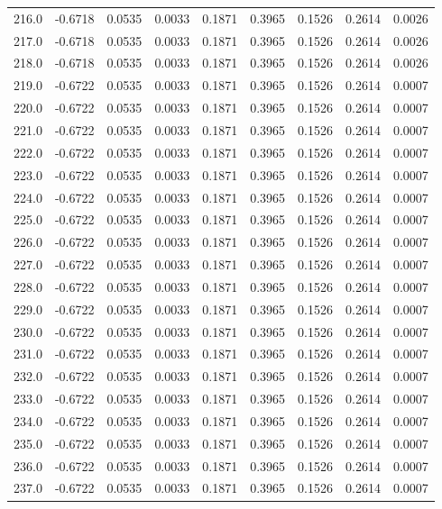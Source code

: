 \begin{longtable}{lrrrrrrrr}
216.0 & -0.6718 & 0.0535 & 0.0033 & 0.1871 & 0.3965 & 0.1526 & 0.2614 & 0.0026 \\
217.0 & -0.6718 & 0.0535 & 0.0033 & 0.1871 & 0.3965 & 0.1526 & 0.2614 & 0.0026 \\
218.0 & -0.6718 & 0.0535 & 0.0033 & 0.1871 & 0.3965 & 0.1526 & 0.2614 & 0.0026 \\
219.0 & -0.6722 & 0.0535 & 0.0033 & 0.1871 & 0.3965 & 0.1526 & 0.2614 & 0.0007 \\
220.0 & -0.6722 & 0.0535 & 0.0033 & 0.1871 & 0.3965 & 0.1526 & 0.2614 & 0.0007 \\
221.0 & -0.6722 & 0.0535 & 0.0033 & 0.1871 & 0.3965 & 0.1526 & 0.2614 & 0.0007 \\
222.0 & -0.6722 & 0.0535 & 0.0033 & 0.1871 & 0.3965 & 0.1526 & 0.2614 & 0.0007 \\
223.0 & -0.6722 & 0.0535 & 0.0033 & 0.1871 & 0.3965 & 0.1526 & 0.2614 & 0.0007 \\
224.0 & -0.6722 & 0.0535 & 0.0033 & 0.1871 & 0.3965 & 0.1526 & 0.2614 & 0.0007 \\
225.0 & -0.6722 & 0.0535 & 0.0033 & 0.1871 & 0.3965 & 0.1526 & 0.2614 & 0.0007 \\
226.0 & -0.6722 & 0.0535 & 0.0033 & 0.1871 & 0.3965 & 0.1526 & 0.2614 & 0.0007 \\
227.0 & -0.6722 & 0.0535 & 0.0033 & 0.1871 & 0.3965 & 0.1526 & 0.2614 & 0.0007 \\
228.0 & -0.6722 & 0.0535 & 0.0033 & 0.1871 & 0.3965 & 0.1526 & 0.2614 & 0.0007 \\
229.0 & -0.6722 & 0.0535 & 0.0033 & 0.1871 & 0.3965 & 0.1526 & 0.2614 & 0.0007 \\
230.0 & -0.6722 & 0.0535 & 0.0033 & 0.1871 & 0.3965 & 0.1526 & 0.2614 & 0.0007 \\
231.0 & -0.6722 & 0.0535 & 0.0033 & 0.1871 & 0.3965 & 0.1526 & 0.2614 & 0.0007 \\
232.0 & -0.6722 & 0.0535 & 0.0033 & 0.1871 & 0.3965 & 0.1526 & 0.2614 & 0.0007 \\
233.0 & -0.6722 & 0.0535 & 0.0033 & 0.1871 & 0.3965 & 0.1526 & 0.2614 & 0.0007 \\
234.0 & -0.6722 & 0.0535 & 0.0033 & 0.1871 & 0.3965 & 0.1526 & 0.2614 & 0.0007 \\
235.0 & -0.6722 & 0.0535 & 0.0033 & 0.1871 & 0.3965 & 0.1526 & 0.2614 & 0.0007 \\
236.0 & -0.6722 & 0.0535 & 0.0033 & 0.1871 & 0.3965 & 0.1526 & 0.2614 & 0.0007 \\
237.0 & -0.6722 & 0.0535 & 0.0033 & 0.1871 & 0.3965 & 0.1526 & 0.2614 & 0.0007 \\

\end{longtable}
